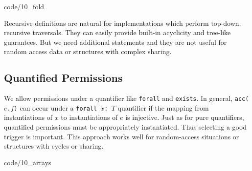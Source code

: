  {code/10_fold}
\begin{mytitle} Recursive definitions are natural for implementations which perform top-down, recursive traversals. They can easily provide built-in acyclicity and tree-like guarantees. But we need additional statements and they are not useful for random access data or structures with complex sharing.
\end{mytitle}

\subsection{Quantified Permissions}
\begin{mytitle} We allow permissions under a quantifier like \texttt{forall} and \texttt{exists}. In general, \texttt{acc($e$.$f$)} can occur under a \texttt{forall $x$: $T$} quantifier if the mapping from instantiations of $x$ to instantiations of $e$ is injective. Just as for pure quantifiers, quantified permissions must be appropriately instantiated. Thus selecting a good trigger is important. This approach works well for random-access situations or structures with cycles or sharing. 
\end{mytitle}
 {code/10_arrays}

